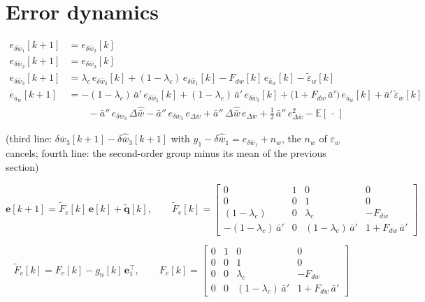 \documentclass[11pt,a4paper,fontset=none]{ctexart}
\newcommand{\ba}{\bar{a}}
\newcommand{\bw}{\bar{w}}
\newcommand{\E}{\mathbb{E}}
\newcommand{\dWh}{\Delta\hat{\bw}}
\newcommand{\eD}{e_{\Delta\bw}}
\newcommand{\ap}{\ba'}
\newcommand{\app}{\ba''}
\newcommand{\et}{\tilde{\varepsilon}_w}
\begin{document}
\section{Error dynamics}

\begin{align*}
e_{\delta\bw_1}[k+1] &= e_{\delta\bw_2}[k] \\
e_{\delta\bw_2}[k+1] &= e_{\delta\bw_3}[k] \\
e_{\delta\bw_3}[k+1] &= \lambda_c\,e_{\delta\bw_3}[k] + (1-\lambda_c)\,e_{\delta\bw_1}[k] - F_{dw}[k]\,e_{\ba_w}[k] - \et[k] \\
e_{\ba_w}[k+1]       &= -(1-\lambda_c)\,\ap\,e_{\delta\bw_1}[k]
                      + (1-\lambda_c)\,\ap\,e_{\delta\bw_3}[k]
                      + \bigl(1 + F_{dw}\,\ap\bigr)\,e_{\ba_w}[k]
                      + \ap\,\et[k] \\
                     &\qquad - \app\,e_{\delta\bw_3}\,\dWh - \app\,e_{\delta\bw_3}\,\eD + \app\,\dWh\,\eD + \tfrac{1}{2}\,\app\,\eD^{2}
                      - \E[\,\cdot\,]
\end{align*}

(third line: $\delta\bw_3[k+1] - \delta\hat{\bw}_3[k+1]$ with $y_1 - \delta\hat{\bw}_1 = e_{\delta\bw_1} + n_w$, the $n_w$ of $\varepsilon_w$ cancels;
fourth line: the second-order group minus its mean of the previous section)

\begin{equation*}
\mathbf{e}[k+1] = \tilde{F}_e[k]\,\mathbf{e}[k] + \tilde{\mathbf{q}}[k], \qquad
\tilde{F}_e[k] =
\begin{bmatrix}
0 & 1 & 0 & 0 \\
0 & 0 & 1 & 0 \\
(1-\lambda_c) & 0 & \lambda_c & -F_{dw} \\
-(1-\lambda_c)\,\ap & 0 & (1-\lambda_c)\,\ap & 1 + F_{dw}\,\ap
\end{bmatrix}
\end{equation*}

\begin{equation*}
\tilde{F}_e[k] = F_e[k] - g_n[k]\,\mathbf{e}_1^{\top}, \qquad
F_e[k] =
\begin{bmatrix}
0 & 1 & 0 & 0 \\
0 & 0 & 1 & 0 \\
0 & 0 & \lambda_c & -F_{dw} \\
0 & 0 & (1-\lambda_c)\,\ap & 1 + F_{dw}\,\ap
\end{bmatrix}
\end{equation*}
\end{document}
